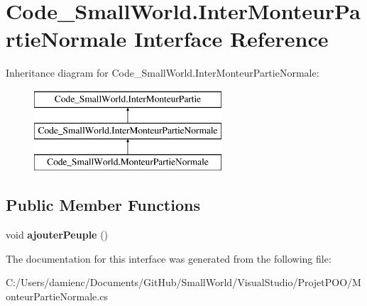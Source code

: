 \hypertarget{interface_code___small_world_1_1_inter_monteur_partie_normale}{\section{Code\-\_\-\-Small\-World.\-Inter\-Monteur\-Partie\-Normale Interface Reference}
\label{interface_code___small_world_1_1_inter_monteur_partie_normale}
}
Inheritance diagram for Code\-\_\-\-Small\-World.\-Inter\-Monteur\-Partie\-Normale\-:\begin{figure}[H]
\begin{center}
\leavevmode
\includegraphics[height=3.000000cm]{interface_code___small_world_1_1_inter_monteur_partie_normale}
\end{center}
\end{figure}
\subsection*{Public Member Functions}
\begin{DoxyCompactItemize}
\item 
\hypertarget{interface_code___small_world_1_1_inter_monteur_partie_normale_a813c0455bcaf98b5e35260846d80f825}{void {\bfseries ajouter\-Peuple} ()}\label{interface_code___small_world_1_1_inter_monteur_partie_normale_a813c0455bcaf98b5e35260846d80f825}

\end{DoxyCompactItemize}


The documentation for this interface was generated from the following file\-:\begin{DoxyCompactItemize}
\item 
C\-:/\-Users/damienc/\-Documents/\-Git\-Hub/\-Small\-World/\-Visual\-Studio/\-Projet\-P\-O\-O/Monteur\-Partie\-Normale.\-cs\end{DoxyCompactItemize}
